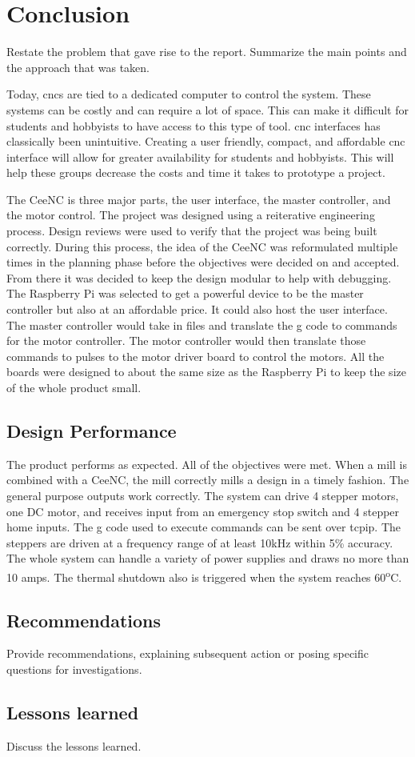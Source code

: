 \chapter{Conclusion}
Restate the problem that gave rise to the report. 
Summarize the main points and the approach that was taken. 

Today, \gls{cnc}s are tied to a dedicated computer to control the system.
These systems can be costly and can require a lot of space.
This can make it difficult for students and hobbyists to have access to this type of tool.
\gls{cnc} interfaces has classically been unintuitive.
Creating a user friendly, compact, and affordable \gls{cnc} interface will allow for greater availability for students and hobbyists.
This will help these groups decrease the costs and time it takes to prototype a project.

The CeeNC is three major parts, the user interface, the master controller, and the motor control.
The project was designed using a reiterative engineering process.
Design reviews were used to verify that the project was being built correctly.
During this process, the idea of the CeeNC was reformulated multiple times in the planning phase before the objectives were decided on and accepted.
From there it was decided to keep the design modular to help with debugging.
The Raspberry Pi was selected to get a powerful device to be the master controller but also at an affordable price.
 It could also host the user interface.
The master controller would take in files and translate the g code to commands for the motor controller.
The motor controller would then translate those commands to pulses to the motor driver board to control the motors.
All the boards were designed to about the same size as the Raspberry Pi to keep the size of the whole product small.


\section{Design Performance}

The product performs as expected.
All of the objectives were met.
When a mill is combined with a CeeNC, the mill correctly mills a design in a timely fashion. 
The general purpose outputs work correctly.
The system can drive 4 stepper motors, one DC motor, and receives input from an emergency stop switch and 4 stepper home inputs.
The g code used to execute commands can be sent over \gls{tcpip}.
The steppers are driven at a frequency range of at least 10kHz within 5\% accuracy.
The whole system can handle a variety of power supplies and draws no more than 10 amps.
The thermal shutdown also is triggered when the system reaches 60\textsuperscript{o}C.
\section{Recommendations}
Provide recommendations, explaining subsequent action or posing specific questions for investigations. 

\section{Lessons learned}
Discuss the lessons learned. 